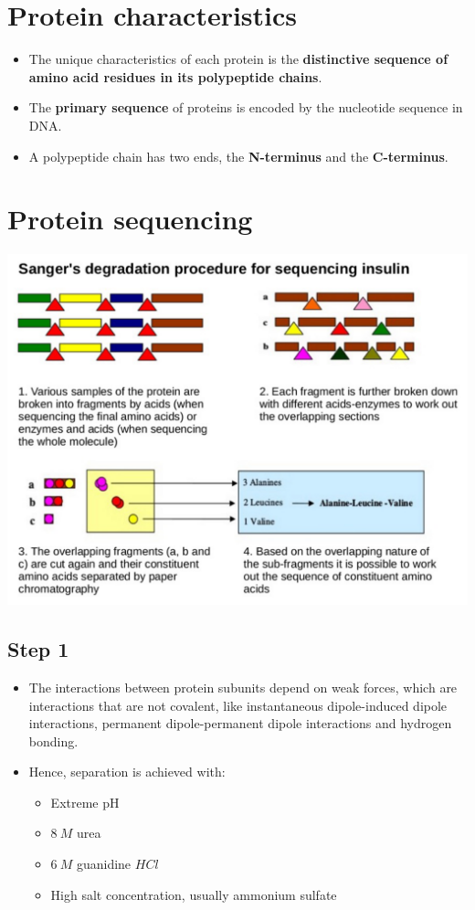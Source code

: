 \documentclass[11pt]{article}
\begin{document}
\section{Protein characteristics}
\label{sec:orgc23a181}
\begin{itemize}
\item The unique characteristics of each protein is the \textbf{distinctive sequence of amino acid residues in its polypeptide chains}.
\item The \textbf{primary sequence} of proteins is encoded by the nucleotide sequence in DNA.
\item A polypeptide chain has two ends, the \textbf{N-terminus} and the \textbf{C-terminus}.
\end{itemize}


\section{Protein sequencing}
\label{sec:orgb960ff0}

\begin{center}
\includegraphics[width=.9\linewidth]{./images/protein-sequencing.png}
\end{center}

\subsection{Step 1}
\label{sec:orgdd1d78e}
\begin{itemize}
\item The interactions between protein subunits depend on weak forces, which are interactions that are not covalent, like instantaneous dipole-induced dipole interactions, permanent dipole-permanent dipole interactions and hydrogen bonding.
\item Hence, separation is achieved with:
\begin{itemize}
\item Extreme pH
\item \(\qty{8}{\unit{M}}\) urea
\item \(\qty{6}{\unit{M}}\) guanidine \(HCl\)
\item High salt concentration, usually ammonium sulfate
\end{itemize}
\end{itemize}
\end{document}
